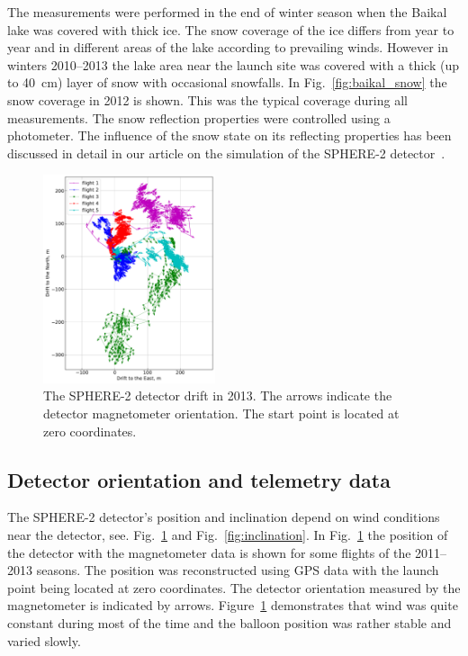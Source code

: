 \documentclass[universe,article,submit,moreauthors,pdftex]{Definitions/mdpi}
\begin{document}
The measurements were performed in the end of winter season when the Baikal lake was covered with thick ice. The snow coverage of the ice differs from year to year and in different areas of the lake according to prevailing winds. However in winters 2010--2013 the lake area near the launch site was covered with a thick (up to 40~cm) layer of snow with occasional snowfalls. In Fig.~\ref{fig:baikal_snow} the snow coverage in 2012 is shown. This was the typical coverage during all measurements. The snow reflection properties were controlled using a photometer. The influence of the snow state on its reflecting properties has been discussed in detail in our article on the simulation of the SPHERE-2 detector~\cite{Ant19}.


\begin{figure}[tb]
    \includegraphics[width=0.45\textwidth]{GPS+quiver.pdf}\hspace{2pc}%
    \caption{The SPHERE-2 detector drift in 2013. The arrows indicate the detector magnetometer orientation. The start point is located at zero coordinates.}
\label{fig:gps_compass}
\end{figure}

 
\subsection{Detector orientation and telemetry data}
\label{sect:telemetrydata}

The \mbox{SPHERE-2} detector's position and inclination depend on wind conditions near the detector, see. Fig.~\ref{fig:gps_compass} and Fig.~\ref{fig:inclination}. In Fig.~\ref{fig:gps_compass} the position of the detector with the magnetometer data is shown for some flights of the 2011--2013 seasons. The position was reconstructed using GPS data with the launch point being located at zero coordinates. The detector orientation measured by the magnetometer is indicated by arrows. Figure~\ref{fig:gps_compass} demonstrates that wind was quite constant during most of the time and the balloon position was rather stable and varied slowly.  
\end{document}
